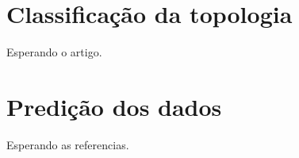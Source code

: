\section{Classificação da topologia}
Esperando o artigo.

\section{Predição dos dados}
\label{chap:pred}
Esperando as referencias.


\